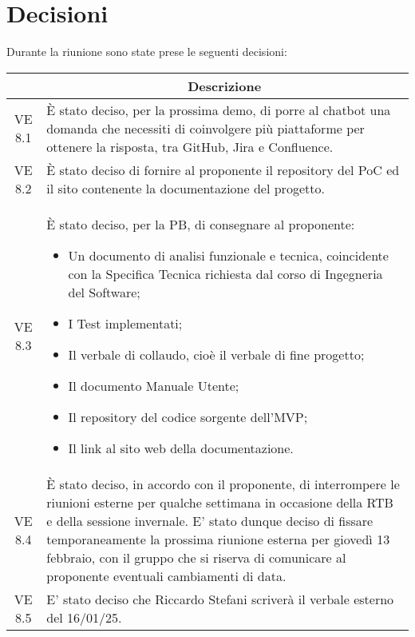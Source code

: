 

\section{Decisioni}

Durante la riunione sono state prese le seguenti decisioni:

\vspace{0.5cm}

\begin{table}[htbp]
    \centering
    \begin{tabular}{|c|p{}|}
        \hline
        \rowcolor[gray]{0.75}
        \multicolumn{1}{|c|}{\textbf{Codice}} & \multicolumn{1}{|c|}{\textbf{Descrizione}}\\
        \hline
        VE 8.1 & È stato deciso, per la prossima demo, di porre al chatbot una domanda che necessiti di coinvolgere più 
        piattaforme per ottenere la risposta, tra GitHub, Jira e Confluence.\\
        \hline
        VE 8.2 & È stato deciso di fornire al proponente il repository del PoC ed il sito contenente la documentazione del progetto.\\
        \hline
        VE 8.3 & È stato deciso, per la PB, di consegnare al proponente:
        \begin{itemize}
            \item Un documento di analisi funzionale e tecnica, coincidente con la Specifica Tecnica richiesta dal corso di Ingegneria del Software;
            \item I Test implementati;
            \item Il verbale di collaudo, cioè il verbale di fine progetto;
            \item Il documento Manuale Utente;
            \item Il repository del codice sorgente dell'MVP;
            \item Il link al sito web della documentazione.
        \end{itemize}\\
        \hline
        VE 8.4 & È stato deciso, in accordo con il proponente, di interrompere le riunioni esterne per qualche settimana in occasione
        della RTB e della sessione invernale. E' stato dunque deciso di fissare temporaneamente la prossima riunione esterna per 
        giovedì 13 febbraio, con il gruppo che si riserva di comunicare al proponente eventuali cambiamenti di data.\\
        \hline
        VE 8.5 & E' stato deciso che Riccardo Stefani scriverà il verbale esterno del 16/01/25.\\
        \hline
    \end{tabular}
\end{table}